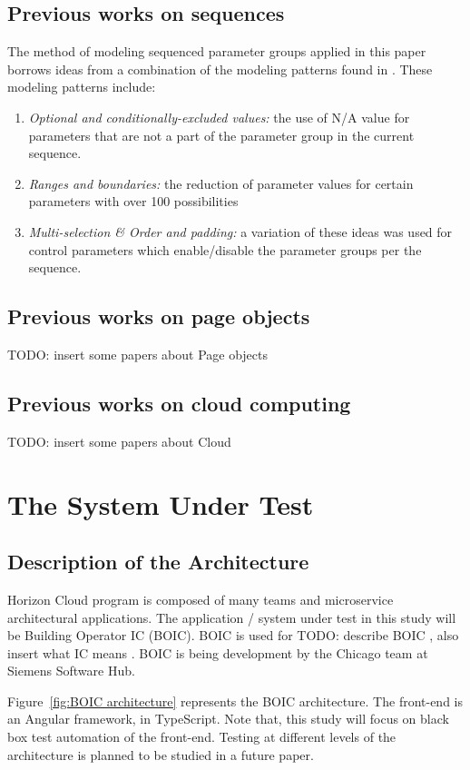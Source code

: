 \documentclass[conference]{IEEEtran}
\newcommand{\todo}[1]{}
\renewcommand{\todo}[1]{{\color{red} TODO: {#1}}}
\begin{document}
	\subsection{Previous works on sequences}
	The method of modeling sequenced parameter groups applied in this paper borrows ideas from a combination of the modeling patterns found in \cite{segall2012common}.
	These modeling patterns include: 
	\begin{enumerate}
		\item \textit{Optional and conditionally-excluded values:} the use of N/A value for parameters that are not a part of the parameter group in the current sequence.
		\item \textit{Ranges and boundaries:} the reduction of parameter values for certain parameters with over 100 possibilities
		\item	\textit{Multi-selection \& Order and padding:} a variation of these ideas was used for control parameters which enable/disable the parameter groups per the sequence.
	\end{enumerate}

	\subsection{Previous works on page objects}
	\todo{insert some papers about Page objects}
	
	\subsection{Previous works on cloud computing}
	\todo{insert some papers about Cloud}

\section{The System Under Test}

	\subsection{Description of the Architecture}
	
	Horizon Cloud program is composed of many teams and microservice architectural applications.
	The application / system under test in this study will be Building Operator IC (BOIC).
	BOIC is used for \todo {describe BOIC , also insert what IC means} . BOIC is being development by the Chicago team at Siemens Software Hub. 

	Figure~\ref{fig:BOIC architecture} represents the BOIC architecture.
	The front-end is an Angular framework, in TypeScript.
	Note that, this study will focus on black box test automation of the front-end. Testing at different levels of the architecture is planned to be studied in a future paper. 
	
\end{document}
